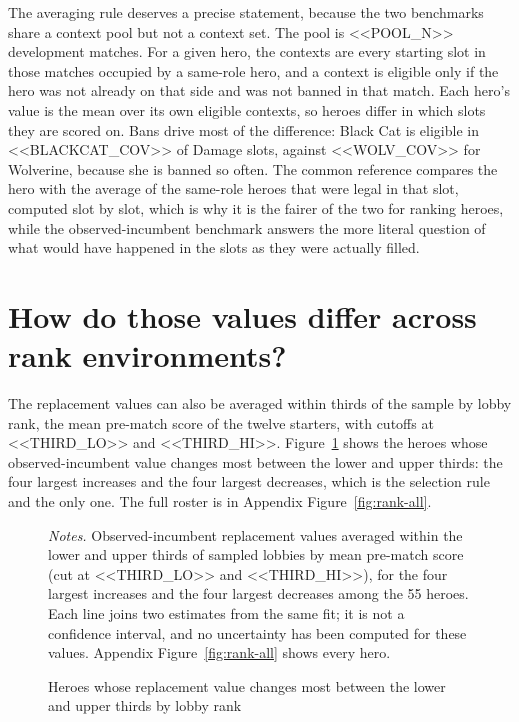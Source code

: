 \documentclass[11pt]{article}
\begin{document}
The averaging rule deserves a precise statement, because the two benchmarks share a context pool but not a
context set. The pool is <<POOL_N>> development matches. For a given hero, the contexts are every starting
slot in those matches occupied by a same-role hero, and a context is eligible only if the hero was not
already on that side and was not banned in that match. Each hero's value is the mean over its own eligible
contexts, so heroes differ in which slots they are scored on. Bans drive most of the difference: Black Cat
is eligible in <<BLACKCAT_COV>> of Damage slots, against <<WOLV_COV>> for Wolverine, because she is banned
so often. The common reference compares the hero with the average of the same-role heroes that were legal
in that slot, computed slot by slot, which is why it is the fairer of the two for ranking heroes, while the
observed-incumbent benchmark answers the more literal question of what would have happened in the slots as
they were actually filled.

\section*{How do those values differ across rank environments?}

The replacement values can also be averaged within thirds of the sample by lobby rank, the mean pre-match
score of the twelve starters, with cutoffs at <<THIRD_LO>> and <<THIRD_HI>>. Figure~\ref{fig:rank} shows
the heroes whose observed-incumbent value changes most between the lower and upper thirds: the four
largest increases and the four largest decreases, which is the selection rule and the only one. The
full roster is in Appendix Figure~\ref{fig:rank-all}.

\begin{figure}[H]\centering
\caption{Heroes whose replacement value changes most between the lower and upper thirds by lobby rank}
\label{fig:rank}
\vspace{2pt}


\begin{minipage}{0.95\linewidth}\footnotesize\vspace{2pt}
\emph{Notes.} Observed-incumbent replacement values averaged within the lower and upper thirds of sampled
lobbies by mean pre-match score (cut at <<THIRD_LO>> and <<THIRD_HI>>), for the four largest increases and
the four largest decreases among the 55 heroes. Each line joins two estimates from the same fit; it is not
a confidence interval, and no uncertainty has been computed for these values. Appendix
Figure~\ref{fig:rank-all} shows every hero.
\end{minipage}
\end{figure}
\end{document}
